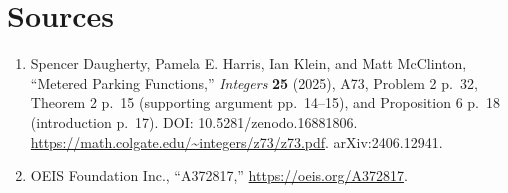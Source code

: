 \documentclass[11pt]{article}
\begin{document}
\section*{Sources}
\begin{enumerate}
\item Spencer Daugherty, Pamela E. Harris, Ian Klein, and Matt McClinton,
``Metered Parking Functions,'' \emph{Integers} \textbf{25} (2025), A73,
Problem 2 p.~32, Theorem 2 p.~15 (supporting argument pp.~14--15), and
Proposition 6 p.~18 (introduction p.~17). DOI: 10.5281/zenodo.16881806.
\url{https://math.colgate.edu/~integers/z73/z73.pdf}. arXiv:2406.12941.
\item OEIS Foundation Inc., ``A372817,'' \url{https://oeis.org/A372817}.
\end{enumerate}
\end{document}

